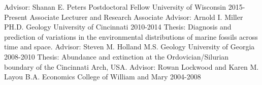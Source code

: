 \begin{cventries}
  \cventry
    {Advisor: Shanan E. Peters}
    {Postdoctoral Fellow}
    {University of Wisconsin}
    {2015-Present}
    {Associate Lecturer and Research Associate}
  \cventry
    {Advisor: Arnold I. Miller}
    {PH.D. Geology}
    {University of Cincinnati}
    {2010-2014}
    {Thesis: Diagnosis and prediction of variations in the environmental distributions of marine fossils across time and space.}
    \cventry
    {Advisor: Steven M. Holland}
    {M.S. Geology}
    {University of Georgia}
    {2008-2010}
    {Thesis: Abundance and extinction at the Ordovician/Silurian boundary of the Cincinnati Arch, USA.}
    \cventry
    {Advisor: Rowan Lockwood and Karen M. Layou}
    {B.A. Economics}
    {College of William and Mary}
    {2004-2008}{}
\end{cventries}